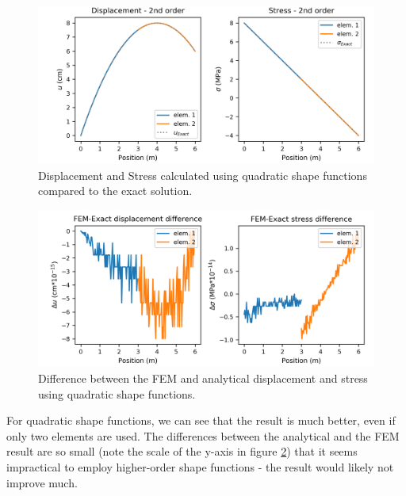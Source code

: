 \documentclass[12pt]{article}
\begin{document}
\section{}
\begin{figure}[h!]
	\centering
	\includegraphics[width=0.9\linewidth]{2nd_order_plot.png}
	\captionsetup{format=hang}
	\caption{Displacement and Stress calculated using quadratic shape functions compared to the exact solution.}
	\label{fig:2plot}
\end{figure}
\begin{figure}[h!]
	\centering
	\includegraphics[width=0.9\linewidth]{2nd_order_diffplot.png}
	\captionsetup{format=hang}
	\caption{Difference between the FEM and analytical displacement and stress using quadratic shape functions.}
	\label{fig:2diffplot}
\end{figure}
For quadratic shape functions, we can see that the result is much better, even if only two elements are used. The differences between the analytical and the FEM result are so small (note the scale of the y-axis in figure \ref{fig:2diffplot}) that it seems impractical to employ higher-order shape functions - the result would likely not improve much.
\end{document}
